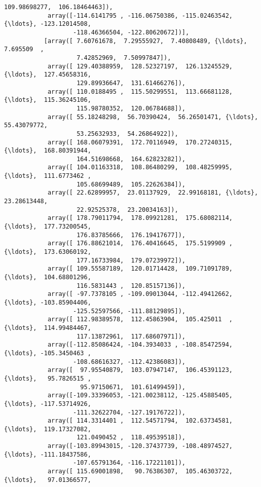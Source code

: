 \documentclass[11pt]{article}
\begin{document}
\begin{Verbatim}[commandchars=\\\{\}]
                    109.98698277,  106.18464463]),
            array([-114.6141795 , -116.06750386, -115.02463542, {\ldots}, -123.12014508,
                   -118.46366504, -122.80620672])],
           [array([ 7.60761678,  7.29555927,  7.40808489, {\ldots},  7.695509  ,
                    7.42852969,  7.50997847]),
            array([ 129.40388959,  128.52327197,  126.13245529, {\ldots},  127.45658316,
                    129.89936647,  131.61466276]),
            array([ 110.0188495 ,  115.50299551,  113.66681128, {\ldots},  115.36245106,
                    115.98780352,  120.06784688]),
            array([ 55.18248298,  56.70390424,  56.26501471, {\ldots},  55.43079772,
                    53.25632933,  54.26864922]),
            array([ 168.06079391,  172.70116949,  170.27240315, {\ldots},  168.80391944,
                    164.51698668,  164.62823282]),
            array([ 104.01163318,  108.86480299,  108.48259995, {\ldots},  111.6773462 ,
                    105.68699489,  105.22626384]),
            array([ 22.62899957,  23.01137929,  22.99168181, {\ldots},  23.28613448,
                    22.92525378,  23.20034163]),
            array([ 178.79011794,  178.09921281,  175.68082114, {\ldots},  177.73200545,
                    176.83785666,  176.19417677]),
            array([ 176.88621014,  176.40416645,  175.5199909 , {\ldots},  173.63060192,
                    177.16733984,  179.07239972]),
            array([ 109.55587189,  120.01714428,  109.71091789, {\ldots},  104.68801296,
                    116.5831443 ,  120.85157136]),
            array([ -97.7378105 , -109.09013044, -112.49412662, {\ldots}, -103.85904406,
                   -125.52597566, -111.88129895]),
            array([ 112.98389578,  112.45863904,  105.425011  , {\ldots},  114.99484467,
                    117.13872961,  117.68607971]),
            array([-112.85086424, -104.3934033 , -108.85472594, {\ldots}, -105.3450463 ,
                   -108.68616327, -112.42386083]),
            array([  97.95540879,  103.07947147,  106.45391123, {\ldots},   95.7826515 ,
                     95.97150671,  101.61499459]),
            array([-109.33396053, -121.00238112, -125.45885405, {\ldots}, -117.53714926,
                   -111.32622704, -127.19176722]),
            array([ 114.3314401 ,  112.54571794,  102.63734581, {\ldots},  119.17327082,
                    121.0490452 ,  118.49539518]),
            array([-103.89943015, -120.37437739, -108.48974527, {\ldots}, -111.18437586,
                   -107.65791364, -116.17221101]),
            array([ 115.69001898,   90.76386307,  105.46303722, {\ldots},   97.01366577,

\end{Verbatim}
\end{document}
